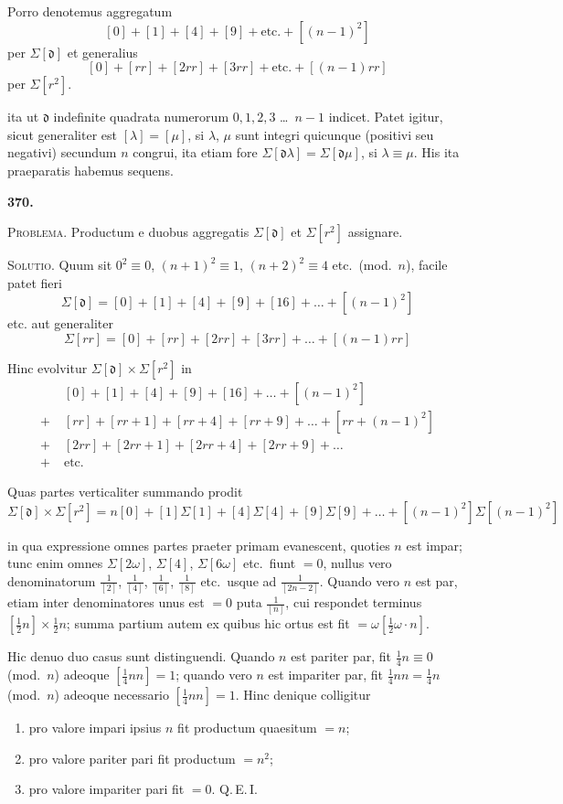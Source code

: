 \documentclass[10pt,a4paper]{article}
\begin{document}
Porro denotemus aggregatum
\[
[0] + [1] + [4] + [9] + \text{etc.} + [(n-1)^2]
\]
per $\Sigma[\mathfrak{d}]$ et generalius
\[
[0] + [rr] + [2rr] + [3rr] + \text{etc.} + [(n-1)rr]
\]
per $\Sigma[r^2]$.

ita ut $\mathfrak{d}$ indefinite quadrata numerorum $0, 1, 2, 3$ \ldots\ $n-1$ indicet. Patet igitur, sicut generaliter est $[\lambda] = [\mu]$, si $\lambda$, $\mu$ sunt integri quicunque (positivi seu negativi) secundum $n$ congrui, ita etiam fore $\Sigma[\mathfrak{d}\lambda] = \Sigma[\mathfrak{d}\mu]$, si $\lambda \equiv \mu$. His ita praeparatis habemus sequens.

\medskip

\textbf{370.}

\textsc{Problema.} Productum e duobus aggregatis $\Sigma[\mathfrak{d}]$ et $\Sigma[r^2]$ assignare.

\textsc{Solutio.} Quum sit $0^2 \equiv 0$, $(n+1)^2 \equiv 1$, $(n+2)^2 \equiv 4$ etc.~(mod.~$n$), facile patet fieri
\[
\Sigma[\mathfrak{d}] = [0] + [1] + [4] + [9] + [16] + \ldots + [(n-1)^2]
\]
etc. aut generaliter
\[
\Sigma[rr] = [0] + [rr] + [2rr] + [3rr] + \ldots + [(n-1)rr]
\]

Hinc evolvitur $\Sigma[\mathfrak{d}] \times \Sigma[r^2]$ in
\begin{align*}
&[0] + [1] + [4] + [9] + [16] + \ldots + [(n-1)^2] \\
+\;&[rr] + [rr+1] + [rr+4] + [rr+9] + \ldots + [rr+(n-1)^2] \\
+\;&[2rr] + [2rr+1] + [2rr+4] + [2rr+9] + \ldots \\
+\;&\text{etc.}
\end{align*}

Quas partes verticaliter summando prodit
\[
\Sigma[\mathfrak{d}] \times \Sigma[r^2] = n[0] + [1]\Sigma[1] + [4]\Sigma[4] + [9]\Sigma[9] + \ldots + [(n-1)^2]\Sigma[(n-1)^2]
\]

in qua expressione omnes partes praeter primam evanescent, quoties $n$ est impar; tunc enim omnes $\Sigma[2\omega]$, $\Sigma[4]$, $\Sigma[6\omega]$ etc.~fiunt $= 0$, nullus vero denominatorum $\frac{1}{[2]}$, $\frac{1}{[4]}$, $\frac{1}{[6]}$, $\frac{1}{[8]}$ etc.~usque ad $\frac{1}{[2n-2]}$. Quando vero $n$ est par, etiam inter denominatores unus est $= 0$ puta $\frac{1}{[n]}$, cui respondet terminus $[\frac{1}{2}n] \times \frac{1}{2}n$; summa partium autem ex quibus hic ortus est fit $= \omega[\frac{1}{2}\omega \cdot n]$.

Hic denuo duo casus sunt distinguendi. Quando $n$ est pariter par, fit $\frac{1}{4}n \equiv 0$ (mod.~$n$) adeoque $[\frac{1}{4}nn] = 1$; quando vero $n$ est impariter par, fit $\frac{1}{4}nn = \frac{1}{4}n$ (mod.~$n$) adeoque necessario $[\frac{1}{4}nn] = 1$. Hinc denique colligitur
\begin{enumerate}
\item pro valore impari ipsius $n$ fit productum quaesitum $= n$;
\item pro valore pariter pari fit productum $= n^2$;
\item pro valore impariter pari fit $= 0$. \quad Q.\,E.\,I.
\end{enumerate}
\end{document}
